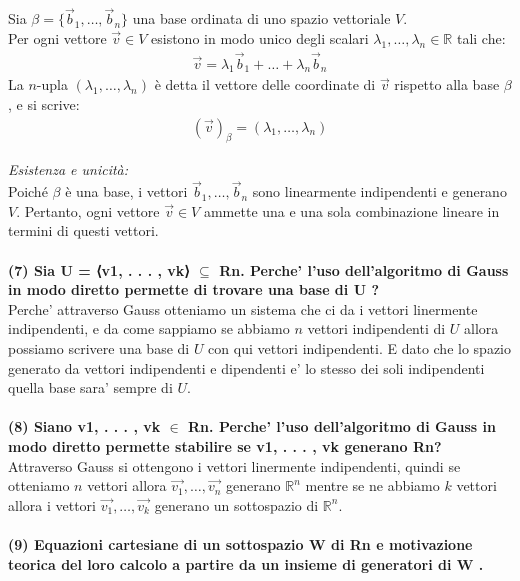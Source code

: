 \documentclass[10pt]{extarticle}
\begin{document}
Sia $\beta = \{\vec{b}_1, \dots, \vec{b}_n\}$ una base ordinata di uno spazio vettoriale $V$. \\
Per ogni vettore $\vec{v} \in V$ esistono in modo unico degli scalari $\lambda_1, \dots, \lambda_n \in \mathbb{R}$ tali che:
\begin{align*}
    \vec{v} = \lambda_1 \vec{b}_1 + \dots + \lambda_n \vec{b}_n
\end{align*}
La $n$-upla $(\lambda_1, \dots, \lambda_n)$ è detta il vettore delle coordinate di $\vec{v}$ rispetto alla base $\beta$, e si scrive:
\begin{align*}
    (\vec{v})_\beta = (\lambda_1, \dots, \lambda_n)
\end{align*}

\textit{Esistenza e unicità:} \\
Poiché $\beta$ è una base, i vettori $\vec{b}_1, \dots, \vec{b}_n$ sono linearmente indipendenti e generano $V$. Pertanto, ogni vettore $\vec{v} \in V$ ammette una e una sola combinazione lineare in termini di questi vettori. \\
\vspace{1em} \\
\textbf{(7) Sia U = ⟨v1, . . . , vk⟩ $\subseteq$ Rn. Perche' l’uso dell’algoritmo di Gauss in modo diretto permette di trovare una base di U ?} \\
Perche' attraverso Gauss otteniamo un sistema che ci da i vettori linermente indipendenti, e da come sappiamo se abbiamo $n$ vettori indipendenti di $U$ allora possiamo scrivere una base di $U$ con qui vettori indipendenti. E dato che lo spazio generato da vettori indipendenti e dipendenti e' lo stesso dei soli indipendenti quella base sara' sempre di $U$. \\
\vspace{1em} \\
\textbf{(8) Siano v1, . . . , vk $\in$ Rn. Perche' l’uso dell’algoritmo di Gauss in modo diretto permette stabilire se v1, . . . , vk generano Rn?}\\
Attraverso Gauss si ottengono i vettori linermente indipendenti, quindi se otteniamo $n$ vettori allora $\vec{v_1},\dots,\vec{v_n}$ generano $\mathbb{R}^n$ mentre se ne abbiamo $k$ vettori allora i vettori $\vec{v_1},\dots,\vec{v_k}$ generano un sottospazio di $\mathbb{R}^n$. \\
\vspace{1em}\\
\textbf{(9) Equazioni cartesiane di un sottospazio W di Rn e motivazione teorica del loro calcolo a partire da un insieme di generatori di W .} \\
\end{document}
